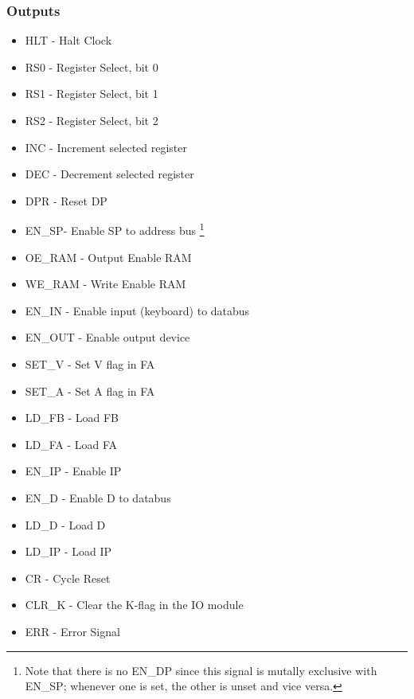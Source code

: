 \subsubsection*{Outputs}
\begin{itemize}
\itemsep0em 
\item HLT - Halt Clock
\item RS0 - Register Select, bit 0
\item RS1 - Register Select, bit 1
\item RS2 - Register Select, bit 2
\item INC - Increment selected register
\item DEC - Decrement selected register
\item DPR - Reset DP
\item EN\_SP- Enable SP to address bus \footnote{Note that there is no EN\_DP since this signal is mutally exclusive with EN\_SP; whenever one is set, the other is unset and vice versa.}
\item OE\_RAM - Output Enable RAM
\item WE\_RAM - Write Enable RAM
\item EN\_IN - Enable input (keyboard) to databus
\item EN\_OUT - Enable output device
\item SET\_V - Set V flag in FA
\item SET\_A - Set A flag in FA
\item LD\_FB - Load FB
\item LD\_FA - Load FA
\item EN\_IP - Enable IP
\item EN\_D - Enable D to databus
\item LD\_D - Load D
\item LD\_IP - Load IP
\item CR - Cycle Reset
\item CLR\_K - Clear the K-flag in the IO module
\item ERR - Error Signal
\end{itemize}


